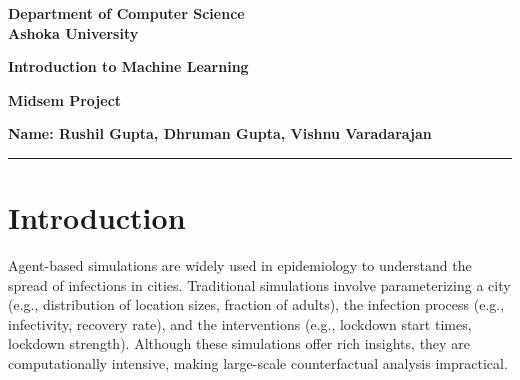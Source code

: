 \documentclass[a4paper]{article}
\begin{document}
\begin{center}
{\large \bf \color{red}  Department of Computer Science} \\
{\large \bf \color{red}  Ashoka University} \\

\vspace{0.1in}

{\large \bf \color{blue} Introduction to Machine Learning} \\

\vspace{0.05in}

    { \bf \color{YellowOrange} Midsem Project}
\end{center}
\medskip

{\textbf{Name: Rushil Gupta, Dhruman Gupta, Vishnu Varadarajan} }

\bigskip
\hrule

\begin{abstract}
\noindent Agent-based models are a cornerstone in epidemiological research, enabling detailed simulations of disease spread by parameterizing aspects of the city, the infection process, and interventions. However, these simulations are computationally expensive, limiting the feasibility of counterfactual analyses across a large parameter space. In this project, we propose to run a large number of simulations upfront to generate a comprehensive dataset and then use machine learning models to learn a mapping from the parameter space to the SIR space. This map can later be used for rapid counterfactual analysis. We investigate several model architectures, including Feed Forward Networks and XGBoost, and demonstrate that predicting the change (delta) in the SIR state yields superior performance compared to directly predicting the next state.
\end{abstract}

\section{Introduction}
Agent-based simulations are widely used in epidemiology to understand the spread of infections in cities. Traditional simulations involve parameterizing a city (e.g., distribution of location sizes, fraction of adults), the infection process (e.g., infectivity, recovery rate), and the interventions (e.g., lockdown start times, lockdown strength). Although these simulations offer rich insights, they are computationally intensive, making large-scale counterfactual analysis impractical.\\
\end{document}
